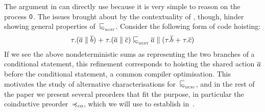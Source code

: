 \begin{example}

\end{example}

The argument in  can directly use 
because it is very simple to reason on the process $\mathop{\textsf{0}}$.
The issues brought about by the contextuality of ,
though, hinder showing general properties of~$\testleqS$.
Consider the following form of code hoisting:
  \begin{equation}
    \label{eq:mailbox-hoisting}
     \tau.(\co{\aa} \Par \co{b}) \extc
     \tau.(\co{\aa} \Par \co{c}) \testleqS \co{\aa} \Par (\tau.\co{b} \extc
     \tau.\co{c})
  \end{equation}
  If we see the above nondeterministic sums as representing the two
  branches of a conditional statement, this refinement corresponds to
  hoisting the shared action $\overline{a}$ before the conditional
  statement, a common compiler optimisation.
%
This motivates the study of alternative characterisations for~$\testleqS$, and
in the rest of the paper we present several preorders that fit the purpose, in
particular the coinductive preorder~$\coindleq$, which we will use to establish
 in~.



